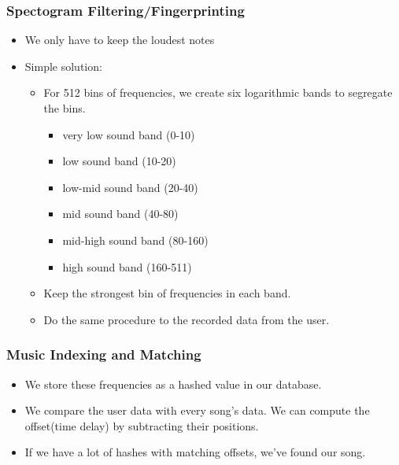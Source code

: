 \documentclass{beamer}
\begin{document}
\begin{frame}
    \frametitle{Spectogram Filtering/Fingerprinting}
    \begin{itemize}
        \item We only have to keep the loudest notes
        \item Simple solution:
        \begin{itemize}
            \item For 512 bins of frequencies, we create six logarithmic bands to segregate the bins.
            \begin{itemize}
                \item very low sound band (0-10)
                \item low sound band (10-20)
                \item low-mid sound band (20-40)
                \item mid sound band (40-80)
                \item mid-high sound band (80-160)
                \item high sound band (160-511)
            \end{itemize}
            \item Keep the strongest bin of frequencies in each band.
            \item Do the same procedure to the recorded data from the user.
        \end{itemize}
    \end{itemize}    
\end{frame}

\begin{frame}
    \frametitle{Music Indexing and Matching}
    \begin{itemize}
        \item We store these frequencies as a hashed value in our database.
        \item We compare the user data with every song's data. We can compute the offset(time delay) by subtracting their positions.
        \item If we have a lot of hashes with matching offsets, we've found our song.
    \end{itemize}
\end{frame}
\end{document}
